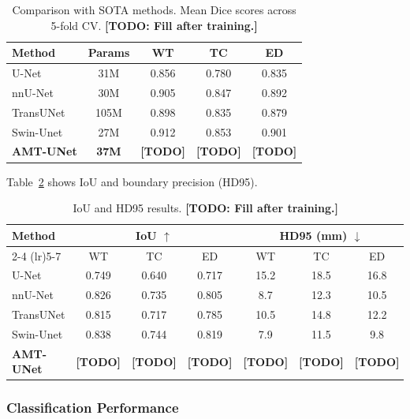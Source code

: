 \begin{table}[t]
\centering
\caption{Comparison with SOTA methods. Mean Dice scores across 5-fold CV. \textbf{[TODO: Fill after training.]}}
\label{tab:comparison}
\begin{tabular}{lcccc}
\toprule
Method & Params & WT & TC & ED \\
\midrule
U-Net \cite{ronneberger2015unet} & 31M & 0.856 & 0.780 & 0.835 \\
nnU-Net \cite{isensee2021nnu} & 30M & 0.905 & 0.847 & 0.892 \\
TransUNet \cite{chen2021transunet} & 105M & 0.898 & 0.835 & 0.879 \\
Swin-Unet \cite{cao2022swin} & 27M & 0.912 & 0.853 & 0.901 \\
\midrule
\textbf{AMT-UNet} & \textbf{37M} & \textbf{[TODO]} & \textbf{[TODO]} & \textbf{[TODO]} \\
\bottomrule
\end{tabular}
\end{table}

Table~\ref{tab:iou_hd95} shows IoU and boundary precision (HD95).

\begin{table}[t]
\centering
\caption{IoU and HD95 results. \textbf{[TODO: Fill after training.]}}
\label{tab:iou_hd95}
\begin{tabular}{lcccccc}
\toprule
\multirow{2}{*}{Method} & \multicolumn{3}{c}{IoU $\uparrow$} & \multicolumn{3}{c}{HD95 (mm) $\downarrow$} \\
\cmidrule(lr){2-4} \cmidrule(lr){5-7}
& WT & TC & ED & WT & TC & ED \\
\midrule
U-Net & 0.749 & 0.640 & 0.717 & 15.2 & 18.5 & 16.8 \\
nnU-Net & 0.826 & 0.735 & 0.805 & 8.7 & 12.3 & 10.5 \\
TransUNet & 0.815 & 0.717 & 0.785 & 10.5 & 14.8 & 12.2 \\
Swin-Unet & 0.838 & 0.744 & 0.819 & 7.9 & 11.5 & 9.8 \\
\midrule
\textbf{AMT-UNet} & \textbf{[TODO]} & \textbf{[TODO]} & \textbf{[TODO]} & \textbf{[TODO]} & \textbf{[TODO]} & \textbf{[TODO]} \\
\bottomrule
\end{tabular}
\end{table}

\subsubsection{Classification Performance}

